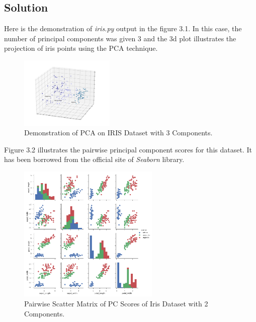 \documentclass[12pt]{article}
\numberwithin{equation}{section}
\numberwithin{table}{section}
\numberwithin{figure}{section}
\begin{document}
\subsection*{Solution}
Here is the demonstration of \textit{iris.py} output in the figure 3.1. In this case, the number of principal components was given 3 and the 3d plot illustrates the projection of iris points using the PCA technique.
		\begin{figure}[!h]\centering
	\includegraphics[width=0.4\textwidth]{4_1.PNG}
	\caption{Demonstration of PCA on IRIS Dataset with 3 Components.}
	\label{pl1}
\end{figure}
Figure 3.2 illustrates the pairwise principal component scores for this dataset. It has been borrowed from the official site of \textit{Seaborn} library.
		\begin{figure}[!h]\centering
	\includegraphics[width=0.6\textwidth]{4_2.PNG}
	\caption{Pairwise Scatter Matrix of PC Scores of Iris Dataset with 2 Components.}
	\label{pl1}
\end{figure}
\end{document}
